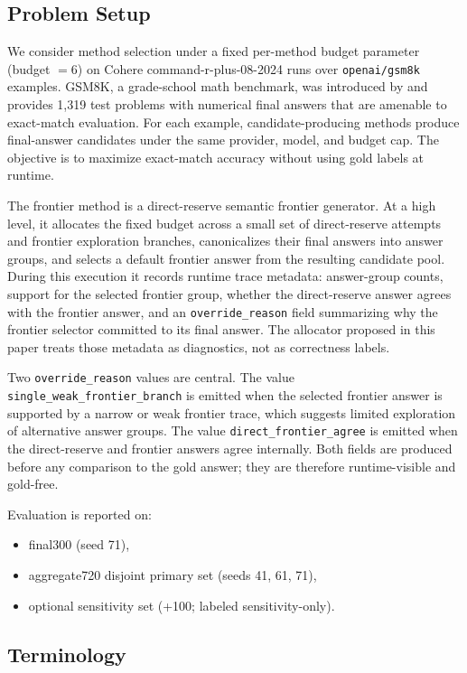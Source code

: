 \subsection{Problem Setup}
We consider method selection under a fixed per-method budget parameter (budget $=6$) on Cohere command-r-plus-08-2024 runs over \texttt{openai/gsm8k} examples. GSM8K, a grade-school math benchmark, was introduced by \citet{cobbe2021training} and provides 1,319 test problems with numerical final answers that are amenable to exact-match evaluation. For each example, candidate-producing methods produce final-answer candidates under the same provider, model, and budget cap. The objective is to maximize exact-match accuracy without using gold labels at runtime.

The frontier method is a direct-reserve semantic frontier generator. At a high
level, it allocates the fixed budget across a small set of direct-reserve attempts
and frontier exploration branches, canonicalizes their final answers into answer
groups, and selects a default frontier answer from the resulting candidate pool.
During this execution it records runtime trace metadata: answer-group counts,
support for the selected frontier group, whether the direct-reserve answer agrees
with the frontier answer, and an \texttt{override\_reason} field summarizing why
the frontier selector committed to its final answer. The allocator proposed in this
paper treats those metadata as diagnostics, not as correctness labels.

Two \texttt{override\_reason} values are central. The value
\texttt{single\_weak\_frontier\_branch} is emitted when the selected frontier
answer is supported by a narrow or weak frontier trace, which suggests limited
exploration of alternative answer groups. The value
\texttt{direct\_frontier\_agree} is emitted when the direct-reserve and frontier
answers agree internally. Both fields are produced before any comparison to the
gold answer; they are therefore runtime-visible and gold-free.

Evaluation is reported on:
\begin{itemize}
    \item final300 (seed 71),
    \item aggregate720 disjoint primary set (seeds 41, 61, 71),
    \item optional sensitivity set (+100; labeled sensitivity-only).
\end{itemize}

\subsection{Terminology}
\label{sec:terminology}

